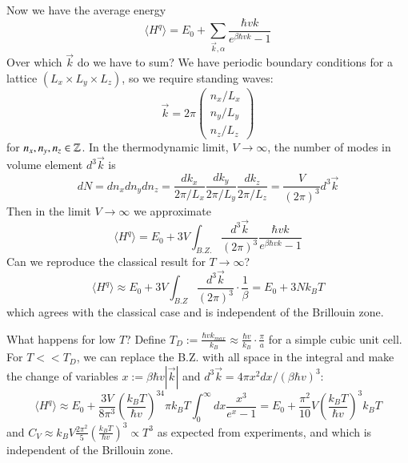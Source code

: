 \documentclass[12pt, a4paper, oneside, openright, titlepage]{book}
\begin{document}
\begin{itemize}
        Now we have the average energy \begin{equation*}
            \langle H^q\rangle = E_0 + \sum_{\vec{k},\alpha} \frac{\hbar vk}{e^{\beta\hbar vk}-1}
        \end{equation*}
        Over which $\vec{k}$ do we have to sum? We have periodic boundary conditions for a lattice $(L_x\times L_y\times L_z)$, so we require standing waves: \begin{equation*}
            \vec{k} = 2\pi \begin{pmatrix} n_x/L_x \\ n_y/L_y \\ n_z/L_z \end{pmatrix}
        \end{equation*}
        for $n_x,n_y,n_z \in \mathbb Z$. In the thermodynamic limit, $V\rightarrow \infty$, the number of modes in volume element $d^3\vec{k}$ is \begin{equation*}
            dN = dn_xdn_ydn_z = \frac{dk_x}{2\pi/L_x}\frac{dk_y}{2\pi/L_y}\frac{dk_z}{2\pi/L_z}=\frac{V}{(2\pi)^3}d^3\vec{k}
        \end{equation*}
        Then in the limit $V\rightarrow \infty$ we approximate \begin{equation*}
            \langle H^q\rangle = E_0 + 3V \int_{B.Z.} \frac{d^3\vec{k}}{(2\pi)^3}\frac{\hbar vk}{e^{\beta\hbar vk}-1}
        \end{equation*}
        Can we reproduce the classical result for $T\rightarrow \infty$?
        \begin{equation*}
            \langle H^q\rangle \approx E_0 + 3V\int_{B.Z}\frac{d^3\vec{k}}{(2\pi)^3}\cdot\frac{1}{\beta} = E_0+3Nk_BT
        \end{equation*}
        which agrees with the classical case and is independent of the Brillouin zone.

        What happens for low $T$? Define $T_D := \frac{\hbar vk_{max}}{k_B} \approx \frac{\hbar v}{k_B}\cdot\frac{\pi}{a}$ for a simple cubic unit cell. For $T << T_D$, we can replace the B.Z. with all space in the integral and make the change of variables $x := \beta\hbar v|\vec{k}|$ and $d^3\vec{k} = 4\pi x^2dx/(\beta\hbar v)^3$:\begin{equation*}
            \langle H^q \rangle \approx E_0+\frac{3V}{8\pi^3}\left(\frac{k_BT}{\hbar v}\right)^34\pi k_BT\int_0^{\infty}dx\frac{x^3}{e^x-1} = E_0+\frac{\pi^2}{10}V\left(\frac{k_BT}{\hbar v}\right)^3k_BT
        \end{equation*}
        and $C_V \approx k_BV\frac{2\pi^2}{5}\left(\frac{k_BT}{\hbar v}\right)^3 \propto T^3$ as expected from experiments, and which is independent of the Brillouin zone.
\end{itemize}
\end{document}
